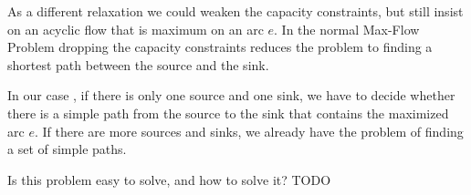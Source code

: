 As a different relaxation we could weaken the capacity constraints, but still insist on an acyclic flow that is maximum 
on an arc $e$. In the normal Max-Flow Problem dropping the capacity constraints reduces the problem to finding a 
shortest path between the source and the sink. 

In our case , if there is only one source and one sink, we have to decide whether there is a simple path from the 
source to the sink that contains the maximized arc $e$. If there are more sources and sinks, we already have the 
problem of finding a set of simple paths. %

%
Is this problem easy to solve, and how to solve it? TODO
%

